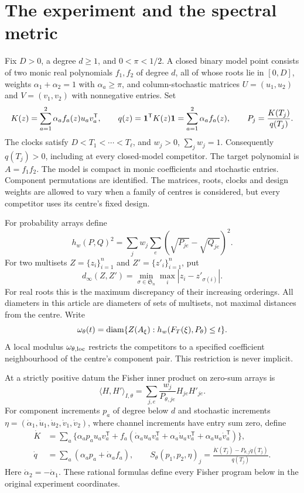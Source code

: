 \section{The experiment and the spectral metric}\label{sec:model}
Fix $D>0$, a degree $d\ge1$, and $0<\pi<1/2$. A closed binary model
point consists of two monic real polynomials $f_1,f_2$ of degree $d$,
all of whose roots lie in $[0,D]$, weights $\alpha_1+\alpha_2=1$ with
$\alpha_a\ge\pi$, and column-stochastic matrices
$U=(u_1,u_2)$ and $V=(v_1,v_2)$ with nonnegative entries. Set
\begin{equation}\label{eq:model}
 K(z)=\sum_{a=1}^2\alpha_af_a(z)u_av_a^{\mathsf T},\qquad
 q(z)=\mathbf 1^{\mathsf T}K(z)\mathbf 1=\sum_{a=1}^2\alpha_af_a(z),\qquad
 P_j=\frac{K(T_j)}{q(T_j)}.
\end{equation}
The clocks satisfy $D<T_1<\cdots<T_\ell$, and $w_j>0$, $\sum_jw_j=1$.
Consequently $q(T_j)>0$, including at every closed-model competitor.
The target polynomial is $A=f_1f_2$. The model is compact in monic
coefficients and stochastic entries. Component permutations are identified.
The matrices, roots, clocks and design weights are allowed to vary when a
family of centres is considered, but every competitor uses its centre's
fixed design.

For probability arrays define
\[
 h_w(P,Q)^2=\sum_jw_j\sum_e(\sqrt{P_{je}}-\sqrt{Q_{je}})^2.
\]
For two multisets $Z=\{z_i\}_{i=1}^n$ and $Z'=\{z'_i\}_{i=1}^n$, put
\[
 d_\infty(Z,Z')=\min_{\sigma\in\mathfrak S_n}\max_i|z_i-z'_{\sigma(i)}|.
\]
For real roots this is the maximum discrepancy of their increasing
orderings. All diameters in this article are diameters of sets of
multisets, not maximal distances from the centre. Write
\begin{equation}\label{eq:modulus}
 \omega_\theta(t)=\operatorname{diam}\{Z(A_\xi):h_w(F_T(\xi),P_\theta)\le t\}.
\end{equation}
A local modulus $\omega_{\theta,\mathrm{loc}}$ restricts the competitors to a
specified coefficient neighbourhood of the centre's component pair.
This restriction is never implicit.

At a strictly positive datum the Fisher inner product on zero-sum arrays is
\[
 \langle H,H'\rangle_{I,\theta}=\sum_{j,e}\frac{w_j}{P_{\theta,je}}H_{je}H'_{je}.
\]
For component increments $p_a$ of degree below $d$ and stochastic
increments $\eta=(\dot\alpha_1,\dot u_1,\dot u_2,\dot v_1,\dot v_2)$,
where channel increments have entry sum zero, define
\begin{align}
 \dot K&=\sum_a\bigl\{\alpha_ap_au_av_a^{\mathsf T}
 +f_a(\dot\alpha_au_av_a^{\mathsf T}
       +\alpha_a\dot u_av_a^{\mathsf T}+\alpha_au_a\dot v_a^{\mathsf T})\bigr\},\nonumber\\
 \dot q&=\sum_a(\alpha_ap_a+\dot\alpha_af_a),\qquad
 S_\theta(p_1,p_2,\eta)_j
       =\frac{\dot K(T_j)-P_{\theta,j}\dot q(T_j)}{q(T_j)}.
                                                        \label{eq:score}
\end{align}
Here $\dot\alpha_2=-\dot\alpha_1$. These rational formulas define every
Fisher program below in the original experiment coordinates.

